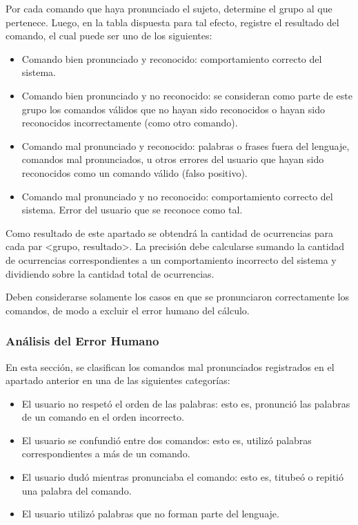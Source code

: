 Por cada comando que haya pronunciado el sujeto, determine el grupo al que pertenece. Luego, en la tabla dispuesta para tal efecto, registre el resultado del comando, el cual puede ser uno de los siguientes:
\begin{itemize}
    \item Comando bien pronunciado y reconocido: comportamiento correcto del sistema.
    \item Comando bien pronunciado y no reconocido: se consideran como parte de este grupo los comandos v\'alidos que no hayan sido reconocidos o hayan sido reconocidos incorrectamente (como otro comando).
    \item Comando mal pronunciado y reconocido: palabras o frases fuera del lenguaje, comandos mal pronunciados, u otros errores del usuario que hayan sido reconocidos como un comando v\'alido (falso positivo).
    \item Comando mal pronunciado y no reconocido: comportamiento correcto del sistema. Error del usuario que se reconoce como tal.
\end{itemize}

Como resultado de este apartado se obtendr\'a la cantidad de ocurrencias para cada par <grupo, resultado>.
La precisi\'on debe calcularse sumando la cantidad de ocurrencias correspondientes a un comportamiento incorrecto del sistema y dividiendo sobre la cantidad total de ocurrencias.

Deben considerarse solamente los casos en que se pronunciaron correctamente los comandos, de modo a excluir el error humano del c\'alculo.


\subsubsection{An\'alisis del Error Humano}
En esta secci\'on, se clasifican los comandos mal pronunciados registrados en el apartado anterior en una de las siguientes categor\'ias:
\begin{itemize}
    \item El usuario no respet\'o el orden de las palabras: esto es, pronunci\'o las palabras de un comando en el orden incorrecto.
    \item El usuario se confundi\'o entre dos comandos: esto es, utiliz\'o palabras correspondientes a m\'as de un comando.
    \item El usuario dud\'o mientras pronunciaba el comando: esto es, titube\'o o repiti\'o una palabra del comando.
    \item El usuario utiliz\'o palabras que no forman parte del lenguaje.
\end{itemize}

